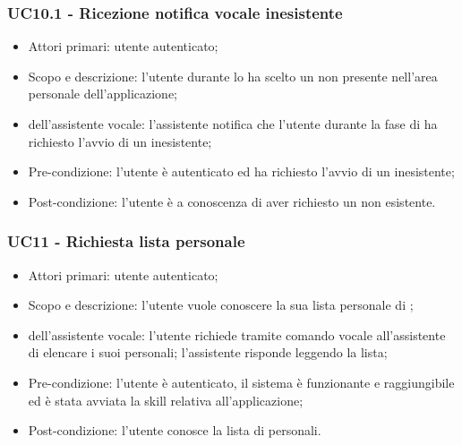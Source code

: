 \subsubsection{UC10.1 - Ricezione notifica vocale  inesistente}
\begin{itemize}
	\item Attori primari: utente autenticato;
	\item Scopo e descrizione: l'utente durante lo  ha scelto un  non presente nell'area personale dell'applicazione;
	\item {} dell'assistente vocale: l'assistente notifica che l'utente durante la fase di  ha richiesto l'avvio di un  inesistente;
	\item Pre-condizione: l'utente è autenticato ed ha richiesto l'avvio di un  inesistente;
	\item Post-condizione: l'utente è a conoscenza di aver richiesto un  non esistente.
\end{itemize}

\subsubsection{UC11 - Richiesta lista personale }
\begin{itemize}
	\item Attori primari: utente autenticato;
	\item Scopo e descrizione: l'utente vuole conoscere la sua lista personale di ;
	\item {} dell'assistente vocale: l'utente richiede tramite comando vocale all'assistente   di elencare i suoi  personali; l'assistente risponde leggendo la lista;
	\item Pre-condizione: l'utente è autenticato, il sistema è funzionante e raggiungibile ed è stata avviata la skill relativa all'applicazione;
	\item Post-condizione: l'utente conosce la lista di  personali.
\end{itemize}

